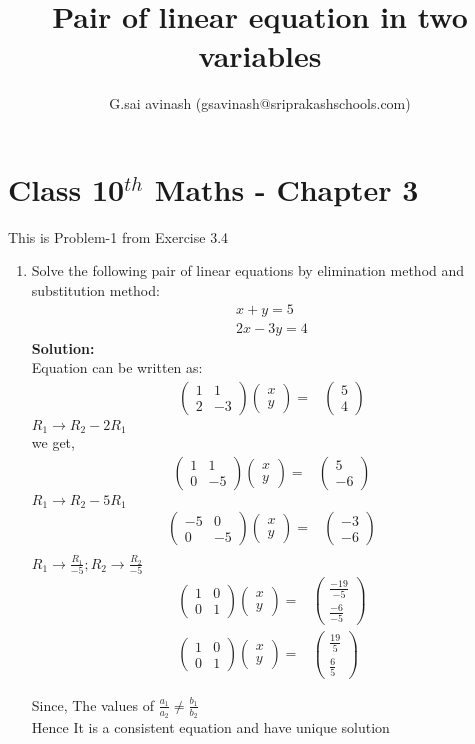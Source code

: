 \documentclass[12pt]{article}
\title{Pair of linear equation in two variables}
\author{G.sai avinash (gsavinash@sriprakashschools.com)}
\newcommand{\myvec}[1]{\ensuremath{\begin{pmatrix}#1\end{pmatrix}}}
\newcommand{\solution}{\noindent \textbf{Solution: }}
\begin{document}
\maketitle
\section*{Class 10$^{th}$ Maths - Chapter 3}
This is Problem-1 from Exercise 3.4
\begin{enumerate}
\item   Solve the following pair of linear equations by elimination method and substitution method:                         
\begin{align}
    x+y=5\\
        2x-3y=4
\end{align}
\solution\\
Equation can be written as:\\
\begin{align}
\myvec{1&1\\2&-3}{\myvec{x\\y}}=& \myvec{5\\4}
\end{align}
$R_1 \xrightarrow\ R_2 - 2R_1$\\ 
we get,
\begin{align}
\myvec{1&1\\0&-5}{\myvec{x\\y}}=& \myvec{5\\-6}
\end{align}
$R_1 \xrightarrow\ R_2 - 5R_1$\\ 
\begin{align}
\myvec{-5&0\\0&-5}{\myvec{x\\y}}=& \myvec{-3\\-6}\\
\end{align}
$R_1\xrightarrow\ \frac{R_1}{-5} ; R_2\xrightarrow\ \frac{R_2}{-5}$\\
\begin{align}
\myvec{1&0\\0&1}{\myvec{x\\y}}=& \myvec{\frac{-19}{-5}\\\frac{-6}{-5}}\\
\myvec{1&0\\0&1}{\myvec{x\\y}}=& \myvec{\frac{19}{5}\\\frac{6}{5}}
\end{align}

Since, The values of $\frac{a_1}{a_2} \neq \frac{b_1}{b_2}$\\
Hence It is a consistent equation and have unique solution


\end{enumerate}
\end{document}
